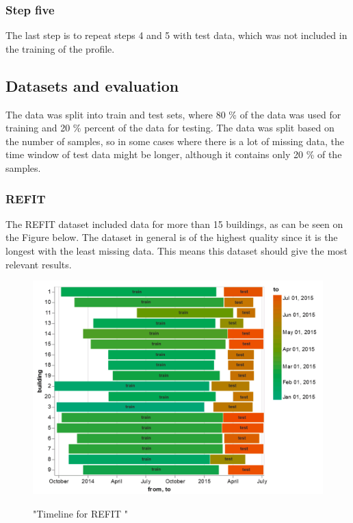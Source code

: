 \subsubsection{Step five}

The last step is to repeat steps 4 and 5 with test data, which was not included in the training of the profile.


\subsection{Datasets and evaluation} \label{ssec:ds_eval}

The data was split into train and test sets, where 80 \% of the data was used for training and 20 \% percent of the data for testing.
The data was split based on the number of samples, so in some cases where there is a lot of missing data, the time window of test data might be longer, although it contains only 20 \% of the samples.

\subsubsection{REFIT}
The REFIT \cite{REFIT} dataset included data for more than 15 buildings, as can be seen on the Figure below.
The dataset in general is of the highest quality since it is the longest with the least missing data.
This means this dataset should give the most relevant results.
\begin{figure}[H]
	\centering
	\caption{"Timeline for REFIT "}
	\includegraphics[width=1\textwidth]{Figures/EC/refit_timeline.png}
	\label{fig:refit_timeline}
\end{figure}


